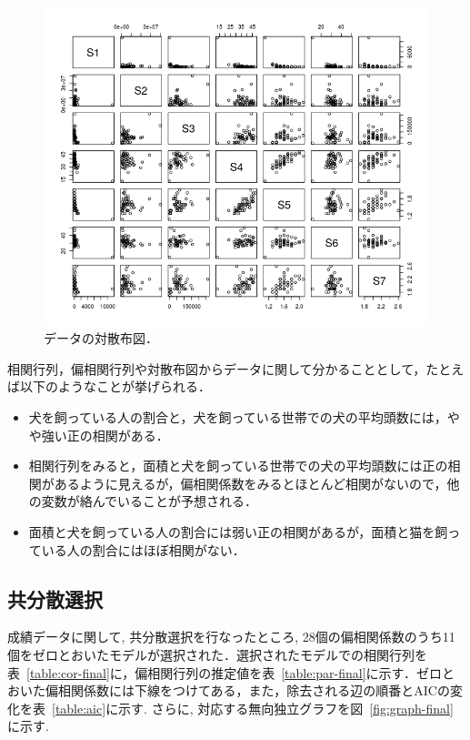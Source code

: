 \documentclass[11pt,dvipdfmx]{jarticle}
\theoremstyle{definition}
\begin{document}
\begin{figure}[htbp]
    \begin{center}
        \includegraphics[width=\linewidth]{pairs}
        \caption{データの対散布図．}
        \label{fig:pairs}
    \end{center}
\end{figure}
\clearpage
相関行列，偏相関行列や対散布図からデータに関して分かることとして，たとえば以下のようなことが挙げられる．
\begin{itemize}
    \item 犬を飼っている人の割合と，犬を飼っている世帯での犬の平均頭数には，やや強い正の相関がある．
    \item 相関行列をみると，面積と犬を飼っている世帯での犬の平均頭数には正の相関があるように見えるが，偏相関係数をみるとほとんど相関がないので，他の変数が絡んでいることが予想される．
    \item 面積と犬を飼っている人の割合には弱い正の相関があるが，面積と猫を飼っている人の割合にはほぼ相関がない．
\end{itemize}



\subsection{共分散選択} \label{subsection:sentaku}

成績データに関して, 共分散選択を行なったところ, 28個の偏相関係数のうち11個をゼロとおいたモデルが選択された．選択されたモデルでの相関行列を表~\ref{table:cor-final}に，偏相関行列の推定値を表~\ref{table:par-final}に示す．ゼロとおいた偏相関係数には下線をつけてある，また，除去される辺の順番とAICの変化を表~\ref{table:aic}に示す. さらに, 対応する無向独立グラフを図~\ref{fig:graph-final} に示す. 
\end{document}

